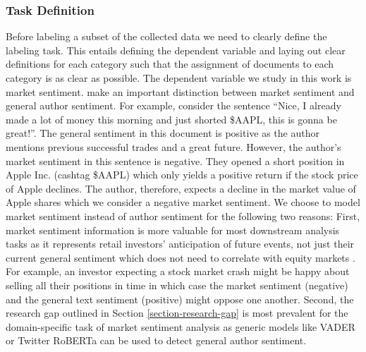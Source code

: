 \subsubsection{Task Definition}
Before labeling a subset of the collected data we need to clearly define the labeling task. This entails defining the dependent variable and laying out clear definitions for each category such that the assignment of documents to each category is as clear as possible. The dependent variable we study in this work is market sentiment.  make an important distinction between market sentiment and general author sentiment. For example, consider the sentence ``Nice, I already made a lot of money this morning and just shorted \$AAPL, this is gonna be great!''. The general sentiment in this document is positive as the author mentions previous successful trades and a great future. However, the author's market sentiment in this sentence is negative. They opened a short position in Apple Inc. (cashtag \$AAPL) which only yields a positive return if the stock price of Apple declines. The author, therefore, expects a decline in the market value of Apple shares which we consider a negative market sentiment. We choose to model market sentiment instead of author sentiment for the following two reasons: First, market sentiment information is more valuable for most downstream analysis tasks as it represents retail investors' anticipation of future events, not just their current general sentiment which does not need to correlate with equity markets \cite{chen2020finsome}. For example, an investor expecting a stock market crash might be happy about selling all their positions in time in which case the market sentiment (negative) and the general text sentiment (positive) might oppose one another.
 Second, the research gap outlined in Section \ref{section-research-gap} is most prevalent for the domain-specific task of market sentiment analysis as generic models like VADER \cite{hutto2014vader} or Twitter RoBERTa \cite{barbieri2020tweeteval} can be used to detect general author sentiment.

